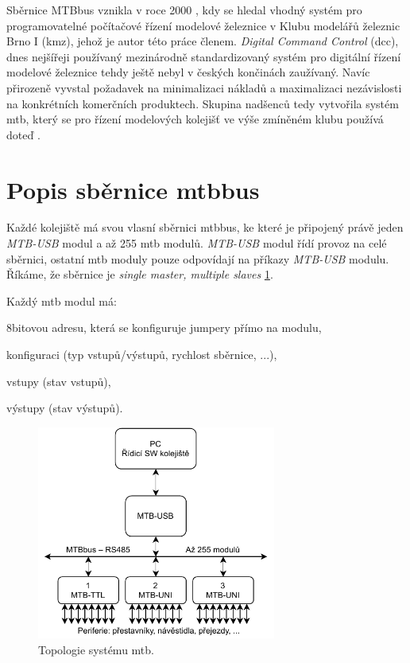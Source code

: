 Sběrnice MTBbus vznikla v roce 2000 \cite{mtb:web}, kdy se hledal vhodný systém
pro programovatelné počítačové řízení modelové železnice v Klubu modelářů
železnic Brno I (\gls{kmz}), jehož je autor této práce členem.
\textit{Digital Command Control} (\gls{dcc}), dnes nejšířeji používaný
mezinárodně standardizovaný systém pro digitální řízení modelové železnice
\cite{dcc_intro:web} tehdy ještě nebyl v českých končinách zaužívaný. Navíc
přirozeně vyvstal požadavek na minimalizaci nákladů a maximalizaci nezávislosti
na konkrétních komerčních produktech. Skupina nadšenců tedy vytvořila systém
\gls{mtb}, který se pro řízení modelových kolejišť ve výše zmíněném klubu
používá doteď \cite{kmz_rizeni:web}.

\section{Popis sběrnice \gls{mtbbus}} \label{sec:mtbbus}

Každé kolejiště má svou vlasní sběrnici \gls{mtbbus}, ke které je připojený
právě jeden \textit{MTB-USB} modul a až 255 \gls{mtb} modulů. \textit{MTB-USB}
modul řídí provoz na celé sběrnici, ostatní \gls{mtb} moduly pouze odpovídají
na příkazy \textit{MTB-USB} modulu. Říkáme, že sběrnice je \textit{single
master, multiple slaves} \ref{fig:mtbbus-topology}.

Každý \gls{mtb} modul má:

\begin{compactenum}
\item 8bitovou adresu, která se konfiguruje jumpery přímo na modulu,
\item konfiguraci (typ vstupů/výstupů, rychlost sběrnice, ...),
\item vstupy (stav vstupů),
\item výstupy (stav výstupů).
\end{compactenum}


\begin{figure}[ht]
\includegraphics[width=0.7\textwidth]{data/mtb-topology.pdf}
\caption{Topologie systému \gls{mtb}.}
\label{fig:mtbbus-topology}
\end{figure}

